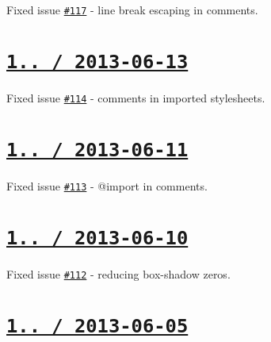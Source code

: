 \begin{DoxyItemize}
\item Fixed issue \href{https://github.com/jakubpawlowicz/clean-css/issues/117}{\tt \#117} -\/ line break escaping in comments.
\end{DoxyItemize}

\section*{\href{https://github.com/jakubpawlowicz/clean-css/compare/v1.0.9...v1.0.10}{\tt 1.. / 2013-\/06-\/13} }


\begin{DoxyItemize}
\item Fixed issue \href{https://github.com/jakubpawlowicz/clean-css/issues/114}{\tt \#114} -\/ comments in imported stylesheets.
\end{DoxyItemize}

\section*{\href{https://github.com/jakubpawlowicz/clean-css/compare/v1.0.8...v1.0.9}{\tt 1.. / 2013-\/06-\/11} }


\begin{DoxyItemize}
\item Fixed issue \href{https://github.com/jakubpawlowicz/clean-css/issues/113}{\tt \#113} -\/ {\ttfamily @import} in comments.
\end{DoxyItemize}

\section*{\href{https://github.com/jakubpawlowicz/clean-css/compare/v1.0.7...v1.0.8}{\tt 1.. / 2013-\/06-\/10} }


\begin{DoxyItemize}
\item Fixed issue \href{https://github.com/jakubpawlowicz/clean-css/issues/112}{\tt \#112} -\/ reducing {\ttfamily box-\/shadow} zeros.
\end{DoxyItemize}

\section*{\href{https://github.com/jakubpawlowicz/clean-css/compare/v1.0.6...v1.0.7}{\tt 1.. / 2013-\/06-\/05} }


